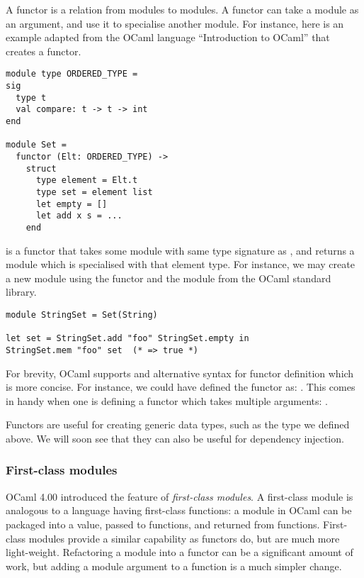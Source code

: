 A functor is a relation from modules to modules. A functor can take a
module as an argument, and use it to specialise another module. For
instance, here is an example adapted from the OCaml language
``Introduction to OCaml'' \cite{ocaml:spec} that creates a 
functor.

\begin{lstlisting}
module type ORDERED_TYPE =
sig
  type t
  val compare: t -> t -> int
end

module Set =
  functor (Elt: ORDERED_TYPE) ->
    struct
      type element = Elt.t
      type set = element list
      let empty = []
      let add x s = ...
    end
\end{lstlisting}

 is a functor that takes some module with same type
signature as , and returns a module which is
specialised with that element type. For instance, we may create a new
 module using the  functor and the
 module from the OCaml standard library.

\begin{lstlisting}
module StringSet = Set(String)

let set = StringSet.add "foo" StringSet.empty in
StringSet.mem "foo" set  (* => true *)
\end{lstlisting}

For brevity, OCaml supports and alternative syntax for functor
definition which is more concise. For instance, we could have defined
the  functor as:
.
This comes in handy when one is defining a functor which takes
multiple arguments:
 .

Functors are useful for creating generic data types, such as the
 type we defined above. We will soon see that they can also
be useful for dependency injection.

\subsubsection{First-class modules}

OCaml 4.00 introduced the feature of \textit{first-class modules}. A
first-class module is analogous to a language having first-class
functions: a module in OCaml can be packaged into a value, passed to
functions, and returned from functions. First-class modules provide a
similar capability as functors do, but are much more
light-weight. Refactoring a module into a functor can be a significant
amount of work, but adding a module argument to a function is a much
simpler change.


